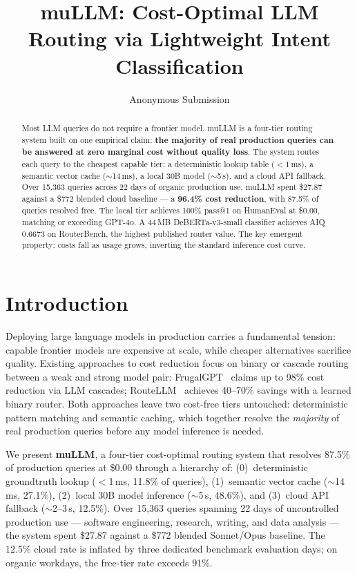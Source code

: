 \documentclass[11pt]{article}
\title{muLLM: Cost-Optimal LLM Routing via Lightweight Intent Classification}
\author{Anonymous Submission}
\begin{document}
\maketitle

\begin{abstract}
Most LLM queries do not require a frontier model. muLLM is a four-tier
routing system built on one empirical claim: \textbf{the majority of
real production queries can be answered at zero marginal cost without
quality loss}. The system routes each query to the cheapest capable
tier: a deterministic lookup table ($<$1\,ms), a semantic vector cache
($\sim$14\,ms), a local 30B model ($\sim$5\,s), and a cloud API
fallback. Over 15,363 queries across 22 days of organic production use,
muLLM spent \$27.87 against a \$772 blended cloud baseline --- a
\textbf{96.4\% cost reduction}, with 87.5\% of queries resolved free.
The local tier achieves 100\% pass@1 on HumanEval at \$0.00, matching
or exceeding GPT-4o. A 44\,MB DeBERTa-v3-small classifier achieves AIQ
0.6673 on RouterBench, the highest published router value. The key 
emergent property: costs fall as usage grows, inverting the standard 
inference cost curve.
\end{abstract}

\section{Introduction}

Deploying large language models in production carries a fundamental
tension: capable frontier models are expensive at scale, while cheaper
alternatives sacrifice quality. Existing approaches to cost reduction
focus on binary or cascade routing between a weak and strong model
pair: FrugalGPT~\cite{chen2023frugalgpt} claims up to 98\% cost
reduction via LLM cascades; RouteLLM~\cite{ong2024routellm} achieves
40--70\% savings with a learned binary router. Both approaches leave two
cost-free tiers untouched: deterministic pattern matching and semantic
caching, which together resolve the \textit{majority} of real
production queries before any model inference is needed.

We present \textbf{muLLM}, a four-tier cost-optimal routing system that
resolves 87.5\% of production queries at \$0.00 through a hierarchy of:
(0)~deterministic groundtruth lookup ($<$1\,ms, 11.8\% of queries),
(1)~semantic vector cache ($\sim$14\,ms, 27.1\%), (2)~local 30B model
inference ($\sim$5\,s, 48.6\%), and (3)~cloud API fallback ($\sim$2--3\,s,
12.5\%). Over 15,363 queries spanning 22 days of uncontrolled
production use --- software engineering, research, writing, and data
analysis --- the system spent \$27.87 against a \$772 blended
Sonnet/Opus baseline. The 12.5\% cloud rate is inflated by three
dedicated benchmark evaluation days; on organic workdays, the
free-tier rate exceeds 91\%.
\end{document}
